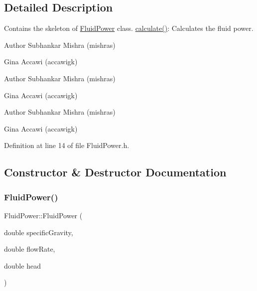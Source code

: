 \subsection{Detailed Description}
Contains the skeleton of \hyperlink{class_fluid_power}{Fluid\+Power} class. \hyperlink{class_fluid_power_a2691f6efdbd5e71aa91e087c6b1c197b}{calculate()}\+: Calculates the fluid power. 

\begin{DoxyAuthor}{Author}
Subhankar Mishra (mishras) 

Gina Accawi (accawigk) 
\end{DoxyAuthor}


\begin{DoxyAuthor}{Author}
Subhankar Mishra (mishras) 

Gina Accawi (accawigk) 
\end{DoxyAuthor}


\begin{DoxyAuthor}{Author}
Subhankar Mishra (mishras) 

Gina Accawi (accawigk) 
\end{DoxyAuthor}


Definition at line 14 of file Fluid\+Power.\+h.



\subsection{Constructor \& Destructor Documentation}
\mbox{\label{class_fluid_power_a9bf61af202e27b9e41ed284b4b1643ee}} 
\subsubsection{\texorpdfstring{Fluid\+Power()}{FluidPower()}\hspace{0.1cm}{\footnotesize\ttfamily [1/6]}}
{\footnotesize\ttfamily Fluid\+Power\+::\+Fluid\+Power (\begin{DoxyParamCaption}\item[{double}]{specific\+Gravity,  }\item[{double}]{flow\+Rate,  }\item[{double}]{head }\end{DoxyParamCaption})\hspace{0.3cm}{\ttfamily [inline]}}

